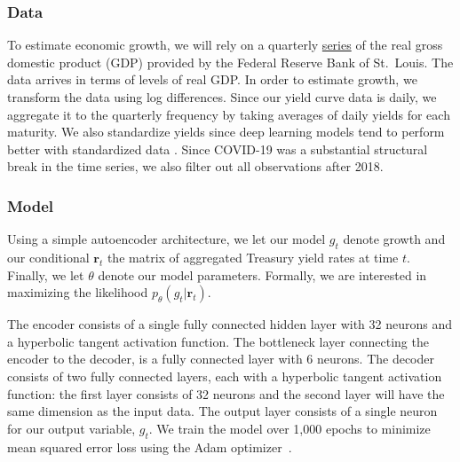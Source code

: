 \subsubsection{Data}\label{data}

To estimate economic growth, we will rely on a quarterly
\href{https://fred.stlouisfed.org/series/GDPC1}{series} of the real gross domestic product (GDP) provided by the Federal Reserve Bank of St.~Louis. The data arrives in terms of levels of real GDP. In order to estimate growth, we transform the data using log differences. Since
our yield curve data is daily, we aggregate it to the
quarterly frequency by taking averages of daily yields for each maturity. We also standardize yields since deep learning models tend to perform better with standardized data \citep{gal2019standardization}. Since COVID-19 was a substantial structural break in the time series, we also filter out all observations after 2018.

\subsubsection{Model}\label{model}


Using a simple autoencoder architecture, we let our model \(g_t\) denote growth and our conditional \(\mathbf{r}_t\) the matrix of aggregated Treasury yield rates at time \(t\). Finally, we let \(\theta\) denote our model parameters. Formally, we are interested in maximizing the likelihood \(p_{\theta}(g_t|\mathbf{r}_t)\). 

The encoder consists of a single fully connected hidden layer with 32 neurons and a hyperbolic tangent activation function. The bottleneck layer connecting the encoder to the decoder, is a fully connected layer with 6 neurons. The decoder consists of two fully connected layers, each with a hyperbolic tangent activation function: the first layer consists of 32 neurons and the second layer will have the same dimension as the input data. The output layer consists of a single neuron for our output variable, \(g_t\). We train the model over 1,000 epochs to minimize mean squared error loss using the Adam optimizer~\citep{kingma2017adam}.

